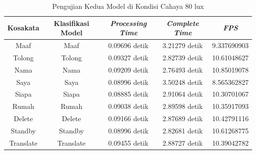 \begin{longtable}{|c|c|c|c|c|}
  \caption{Pengujian Kedua Model di Kondisi Cahaya 80 lux}
  \label{tb:prediksiremang2}                                   \\
  \hline
  \rowcolor[HTML]{C0C0C0}
  \textbf{Kosakata} & \textbf{Klasifikasi Model} & \textbf{\emph{Processing Time}} & \textbf{\emph{Complete Time}} & \textbf{\emph{FPS}}\\
  \hline
  Maaf              & Maaf                        & 0.09696 detik                           & 3.21279 detik                                 & 9.337690903\\
  Tolong            & Tolong                      & 0.09327 detik                           & 2.82739 detik                                 & 10.61048627\\
  Nama              & Nama                        & 0.09209 detik                           & 2.76493 detik                                 & 10.85019078\\
  Saya              & Saya                        & 0.08996 detik                           & 3.50248 detik                                 & 8.565362827\\
  Siapa             & Siapa                       & 0.08885 detik                           & 2.91064 detik                                 & 10.30701067\\
  Rumah             & Rumah                       & 0.09038 detik                           & 2.89598 detik                                 & 10.35917093\\
  Delete            & Delete                      & 0.09166 detik                           & 2.87689 detik                                 & 10.42791116\\
  Standby           & Standby                     & 0.08996 detik                           & 2.82681 detik                                 & 10.61268775\\
  Translate         & Translate                   & 0.09455 detik                           & 2.88727 detik                                 & 10.39042782\\
  \hline
\end{longtable}



